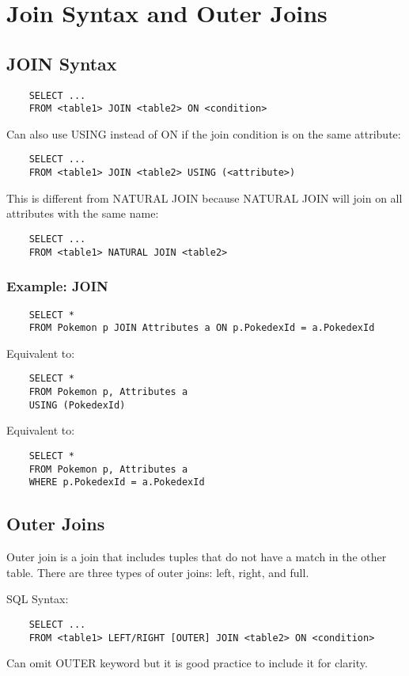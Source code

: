 \documentclass[twoside]{article}
\begin{document}
\section*{Join Syntax and Outer Joins}
\subsection*{JOIN Syntax}
\begin{verbatim}
    SELECT ...
    FROM <table1> JOIN <table2> ON <condition>
\end{verbatim}
Can also use USING instead of ON if the join condition is on the same attribute:
\begin{verbatim}
    SELECT ...
    FROM <table1> JOIN <table2> USING (<attribute>)
\end{verbatim}
This is different from NATURAL JOIN because NATURAL JOIN will join on all
attributes with the same name:
\begin{verbatim}
    SELECT ...
    FROM <table1> NATURAL JOIN <table2>
\end{verbatim}

\subsubsection*{Example: JOIN}
\begin{verbatim}
    SELECT *
    FROM Pokemon p JOIN Attributes a ON p.PokedexId = a.PokedexId
\end{verbatim}
Equivalent to:
\begin{verbatim}
    SELECT *
    FROM Pokemon p, Attributes a
    USING (PokedexId)
\end{verbatim}
Equivalent to:
\begin{verbatim}
    SELECT *
    FROM Pokemon p, Attributes a
    WHERE p.PokedexId = a.PokedexId
\end{verbatim}

\subsection*{Outer Joins}
Outer join is a join that includes tuples that do not have a match in the other
table. There are three types of outer joins: left, right, and full.

SQL Syntax:
\begin{verbatim}
    SELECT ...
    FROM <table1> LEFT/RIGHT [OUTER] JOIN <table2> ON <condition>
\end{verbatim}
Can omit OUTER keyword but it is good practice to include it for clarity.
\end{document}
